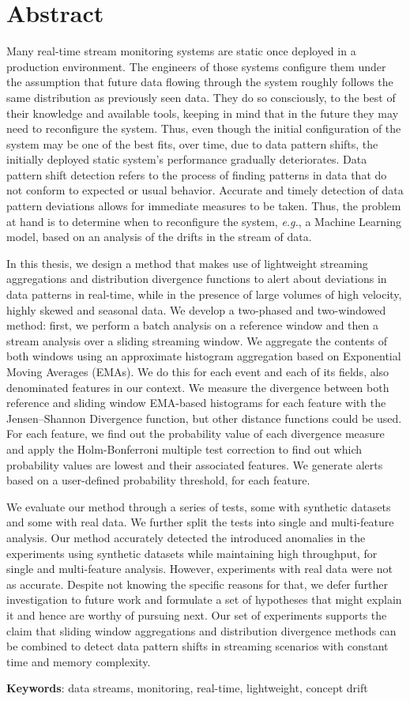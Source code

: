 \chapter*{Abstract}

Many real-time stream monitoring systems are static once deployed in a production environment. The engineers of those systems configure them under the assumption that future data flowing through the system roughly follows the same distribution as previously seen data. They do so consciously, to the best of their knowledge and available tools, keeping in mind that in the future they may need to reconfigure the system. Thus, even though the initial configuration of the system may be one of the best fits, over time, due to data pattern shifts, the initially deployed static system's performance gradually deteriorates. Data pattern shift detection refers to the process of finding patterns in data that do not conform to expected or usual behavior. Accurate and timely detection of data pattern deviations allows for immediate measures to be taken. Thus, the problem at hand is to determine when to reconfigure the system, \textit{e.g.}, a Machine Learning model, based on an analysis of the drifts in the stream of data.

In this thesis, we design a method that makes use of lightweight streaming aggregations and distribution divergence functions to alert about deviations in data patterns in real-time, while in the presence of large volumes of high velocity, highly skewed and seasonal data. We develop a two-phased and two-windowed method: first, we perform a batch analysis on a reference window and then a stream analysis over a sliding streaming window. We aggregate the contents of both windows using an approximate histogram aggregation based on Exponential Moving Averages (EMAs). We do this for each event and each of its fields, also denominated features in our context. We measure the divergence between both reference and sliding window EMA-based histograms for each feature with the Jensen–Shannon Divergence function, but other distance functions could be used. For each feature, we find out the probability value of each divergence measure and apply the Holm-Bonferroni multiple test correction to find out which probability values are lowest and their associated features. We generate alerts based on a user-defined probability threshold, for each feature.

We evaluate our method through a series of tests, some with synthetic datasets and some with real data. We further split the tests into single and multi-feature analysis. Our method accurately detected the introduced anomalies in the experiments using synthetic datasets while maintaining high throughput, for single and multi-feature analysis. However, experiments with real data were not as accurate. Despite not knowing the specific reasons for that, we defer further investigation to future work and formulate a set of hypotheses that might explain it and hence are worthy of pursuing next. Our set of experiments supports the claim that sliding window aggregations and distribution divergence methods can be combined to detect data pattern shifts in streaming scenarios with constant time and memory complexity.

\vspace*{10mm}\noindent
\textbf{Keywords}: data streams, monitoring, real-time, lightweight, concept drift

